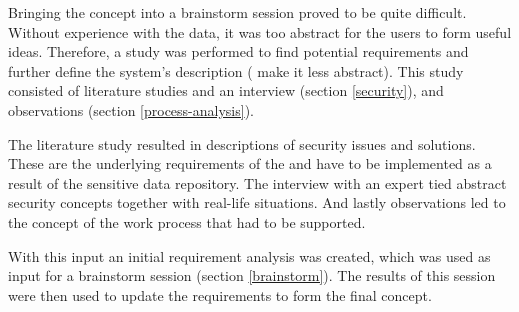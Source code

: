 Bringing the \ivfsystem{} concept into a brainstorm session proved to be quite difficult. 
Without experience with the data, it was too abstract for the users to form useful ideas.
Therefore, a study was performed to find potential requirements and further define the system's description (\ie{} make it less abstract).
This study consisted of literature studies and an interview (section \ref{security}), and observations (section \ref{process-analysis}).

The literature study resulted in descriptions of security issues and solutions.
These are the underlying requirements of the \ivfsystem{} and have to be implemented as a result of the sensitive data repository.
The interview with an expert tied abstract security concepts together with real-life situations.
And lastly observations led to the concept of the work process that had to be supported. 

With this input an initial requirement analysis was created, which was used as input for a brainstorm session (section \ref{brainstorm}).
The results of this session were then used to update the requirements to form the final concept.